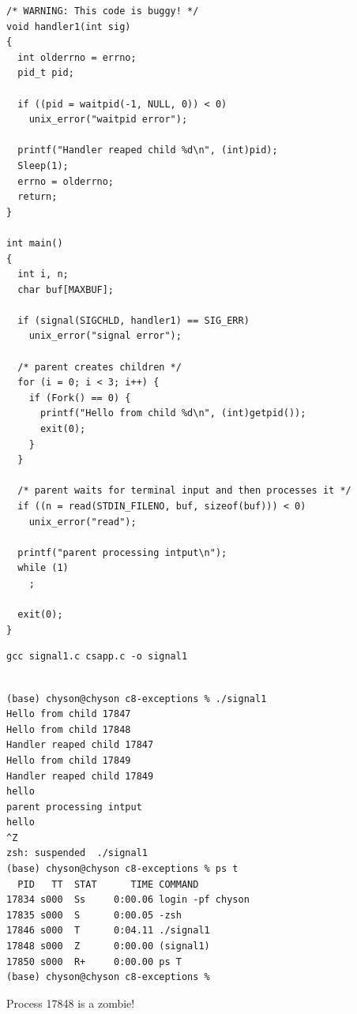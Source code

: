 \documentclass[11pt]{article}
\begin{document}
\begin{enumerate}
\begin{verbatim}
/* WARNING: This code is buggy! */
void handler1(int sig)
{
  int olderrno = errno;
  pid_t pid;

  if ((pid = waitpid(-1, NULL, 0)) < 0)
    unix_error("waitpid error");

  printf("Handler reaped child %d\n", (int)pid);
  Sleep(1);
  errno = olderrno;
  return;
}

int main()
{
  int i, n;
  char buf[MAXBUF];

  if (signal(SIGCHLD, handler1) == SIG_ERR)
    unix_error("signal error");

  /* parent creates children */
  for (i = 0; i < 3; i++) {
    if (Fork() == 0) {
      printf("Hello from child %d\n", (int)getpid());
      exit(0);
    }
  }

  /* parent waits for terminal input and then processes it */
  if ((n = read(STDIN_FILENO, buf, sizeof(buf))) < 0)
    unix_error("read");

  printf("parent processing intput\n");
  while (1)
    ;

  exit(0);
}

\end{verbatim}

\begin{verbatim}
gcc signal1.c csapp.c -o signal1
\end{verbatim}

\begin{verbatim}

(base) chyson@chyson c8-exceptions % ./signal1 
Hello from child 17847
Hello from child 17848
Handler reaped child 17847
Hello from child 17849
Handler reaped child 17849
hello
parent processing intput
hello
^Z
zsh: suspended  ./signal1
(base) chyson@chyson c8-exceptions % ps t
  PID   TT  STAT      TIME COMMAND
17834 s000  Ss     0:00.06 login -pf chyson
17835 s000  S      0:00.05 -zsh
17846 s000  T      0:04.11 ./signal1
17848 s000  Z      0:00.00 (signal1)
17850 s000  R+     0:00.00 ps T
(base) chyson@chyson c8-exceptions % 

\end{verbatim}

Process 17848 is a zombie!\\


\end{enumerate}
\end{document}
